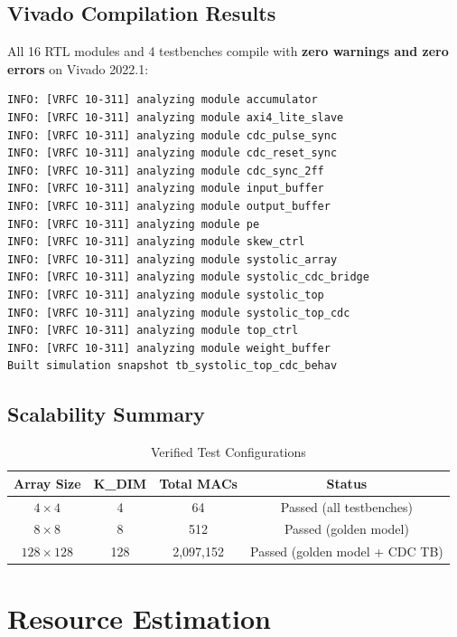 \documentclass[12pt, a4paper]{article}
\begin{document}
\subsection{Vivado Compilation Results}

All 16 RTL modules and 4 testbenches compile with \textbf{zero warnings and zero errors} on Vivado 2022.1:

\begin{lstlisting}[language={}, title={xvlog Compilation (all 16 modules)}]
INFO: [VRFC 10-311] analyzing module accumulator
INFO: [VRFC 10-311] analyzing module axi4_lite_slave
INFO: [VRFC 10-311] analyzing module cdc_pulse_sync
INFO: [VRFC 10-311] analyzing module cdc_reset_sync
INFO: [VRFC 10-311] analyzing module cdc_sync_2ff
INFO: [VRFC 10-311] analyzing module input_buffer
INFO: [VRFC 10-311] analyzing module output_buffer
INFO: [VRFC 10-311] analyzing module pe
INFO: [VRFC 10-311] analyzing module skew_ctrl
INFO: [VRFC 10-311] analyzing module systolic_array
INFO: [VRFC 10-311] analyzing module systolic_cdc_bridge
INFO: [VRFC 10-311] analyzing module systolic_top
INFO: [VRFC 10-311] analyzing module systolic_top_cdc
INFO: [VRFC 10-311] analyzing module top_ctrl
INFO: [VRFC 10-311] analyzing module weight_buffer
Built simulation snapshot tb_systolic_top_cdc_behav
\end{lstlisting}

\subsection{Scalability Summary}

\begin{table}[H]
\centering
\caption{Verified Test Configurations}
\begin{tabular}{@{}cccc@{}}
\toprule
\textbf{Array Size} & \textbf{K\_DIM} & \textbf{Total MACs} & \textbf{Status} \\
\midrule
$4 \times 4$     & 4   & 64          & Passed (all testbenches) \\
$8 \times 8$     & 8   & 512         & Passed (golden model) \\
$128 \times 128$ & 128 & 2,097,152   & Passed (golden model + CDC TB) \\
\bottomrule
\end{tabular}
\end{table}

\section{Resource Estimation}
\end{document}
